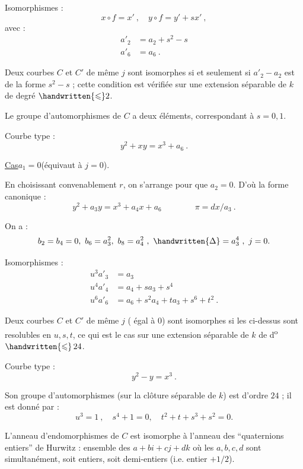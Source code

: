 Isomorphismes :
\[
 x\circ f=x'\ ,\quad y\circ f=y'+sx'\ ,
\]
avec :
\[
\begin{aligned}
 a'_{2}&=a_{2}+s^{2}-s\\
 a'_{6}&=a_{6}\ .
\end{aligned}
\]

Deux courbes $C$ et $C'$ de même $j$ sont isomorphes si et seulement si $a'_{2}-a_{2}$ est de la forme $s^{2}-s$ ; cette condition est vérifiée sur une extension séparable de $k$ de degré $\handwritten{\leqslant}2$.

Le groupe d'automorphismes de $C$ a deux éléments, correspondant à $s=0,1$.

Courbe type :
\[
 y^{2}+xy=x^{3}+a_{6}\ .
\]

\uline{Cas}\quad $a_{1}=0$\quad (équivaut à $j=0$).

En choisissant convenablement $r$, on s'arrange pour que $a_{2}=0$. D'où la forme canonique :
\[
 y^{2}+a_{3}y=x^{3}+a_{4}x+a_{6}\qquad\qquad \pi=dx/a_{3}\ .
\]

On a :
\[
 b_{2}=b_{4}=0,\ b_{6}=a_{3}^{2},\ b_{8}=a_{4}^{2}\ ,\
 \handwritten{\Delta}=a_{3}^{4}\ ,\ j=0.
\]


Isomorphismes :
\[
\begin{aligned}
 u^{3}a'_{3}&=a_{3}\\
 u^{4}a'_{4}&=a_{4}+sa_{3}+s^{4}\\
 u^{6}a'_{6}&=a_{6}+s^{2}a_{4}+ta_{3}+s^{6}+t^{2}\ .
\end{aligned}
\]

Deux courbes $C$ et $C'$ de même $j$ ( égal à $0$) sont isomorphes si les  ci-dessus sont resolubles en $u,s,t$, ce qui est le cas sur une extension séparable de $k$ de d\textsuperscript{o} $\handwritten{\leqslant}\,24$.

Courbe type :
\[
 y^{2}-y=x^{3}\ .
\]

Son groupe d'automorphismes (sur la clôture séparable de $k$) est d'ordre $24$ ; il est donné par :
\[
 u^{3}=1\ ,\quad s^{4}+1=0,\quad t^{2}+t+s^{3}+s^{2}=0.
\]

L'anneau d'endomorphismes de $C$ est isomorphe à l'anneau des ``quaternions entiers'' de Hurwitz : ensemble des $a+bi+cj+dk$ où les $a,b,c,d$ sont simultanément, soit entiers, soit demi-entiers (i.e. entier $+1/2$).


